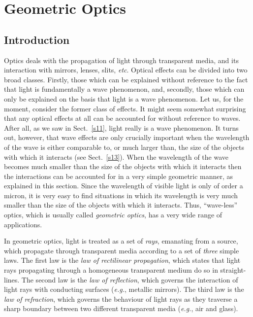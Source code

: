 \section{Geometric Optics}
\subsection{Introduction}
Optics deals with the propagation
of light through transparent media,
and its interaction with mirrors, lenses, slits, {\em etc}.
Optical effects  can be divided into two broad  classes. Firstly, those
which can be explained without reference to the fact that light is
fundamentally a wave phenomenon, and, secondly,  those which can only be explained
on the basis that light is a wave phenomenon. Let us, for the moment, 
consider the former
class of effects. It might seem somewhat surprising that any
 optical effects at all can be
accounted for without reference to  waves. After all,
 as we saw in Sect.~\ref{s11}, light really is a
wave phenomenon. It turns out, however, that wave effects are only 
crucially
important when the wavelength of the wave is either comparable to, or 
much
larger  than, the size of the objects with which it interacts
(see Sect.~\ref{s13}). 
When the wavelength of
the wave  becomes much smaller than the size of the objects with which 
it
interacts then the interactions can be accounted for in a very
simple  geometric manner, as explained in this section. 
Since the
wavelength of visible light is only of order a micron, it is very easy
 to
find situations in which its wavelength  is very much smaller
 than
the size of the objects with which it interacts. Thus,
``wave-less'' optics, which is usually called {\em geometric optics},
 has a
very wide range of applications. 

In geometric optics, light is treated as a set of {\em rays}, emanating
 from
a source, which propagate through transparent media according to
a set of {\em  three}\/ simple laws. The first law is the {\em law of
 rectilinear propagation},
which states that light rays propagating through a 
homogeneous transparent 
 medium  do so in straight-lines.
 The second law is the {\em law
of reflection}, which governs the interaction of light rays with
 conducting
surfaces ({\em e.g.}, metallic mirrors). The third law is the
{\em law of refraction}, which governs the behaviour of light rays as
they traverse a sharp boundary between two different transparent media
({\em e.g.}, air and glass). 


